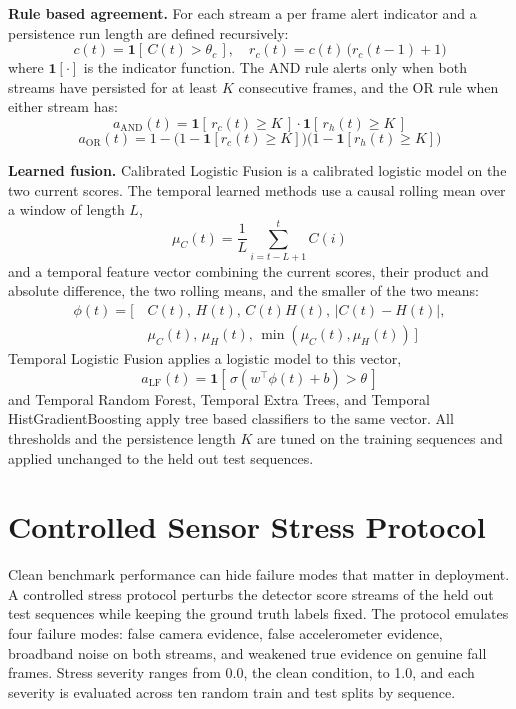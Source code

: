\documentclass[conference]{IEEEtran}
\begin{document}
\textbf{Rule based agreement.} For each stream a per frame alert indicator and a
persistence run length are defined recursively:
\begin{equation}
c(t) = \mathbf{1}[\,C(t) > \theta_c\,], \quad
r_c(t) = c(t)\,\bigl(r_c(t-1) + 1\bigr)
\end{equation}
where $\mathbf{1}[\cdot]$ is the indicator function. The AND rule alerts only
when both streams have persisted for at least $K$ consecutive frames, and the OR
rule when either stream has:
\begin{equation}
a_{\mathrm{AND}}(t) = \mathbf{1}[\,r_c(t) \ge K\,]\cdot\mathbf{1}[\,r_h(t) \ge K\,]
\end{equation}
\begin{equation}
a_{\mathrm{OR}}(t) = 1 - \bigl(1 - \mathbf{1}[r_c(t)\ge K]\bigr)
\bigl(1 - \mathbf{1}[r_h(t)\ge K]\bigr)
\end{equation}

\textbf{Learned fusion.} Calibrated Logistic Fusion is a calibrated logistic
model on the two current scores. The temporal learned methods use a causal
rolling mean over a window of length $L$,
\begin{equation}
\mu_C(t) = \frac{1}{L}\sum_{i=t-L+1}^{t} C(i)
\end{equation}
and a temporal feature vector combining the current scores, their product and
absolute difference, the two rolling means, and the smaller of the two means:
\begin{equation}
\begin{split}
\phi(t) = \bigl[\,&C(t),\, H(t),\, C(t)H(t),\, |C(t)-H(t)|,\\
&\mu_C(t),\, \mu_H(t),\, \min(\mu_C(t),\mu_H(t))\,\bigr]
\end{split}
\end{equation}
Temporal Logistic Fusion applies a logistic model to this vector,
\begin{equation}
a_{\mathrm{LF}}(t) = \mathbf{1}\!\left[\,\sigma(w^{\top}\phi(t) + b) > \theta\,\right]
\end{equation}
and Temporal Random Forest, Temporal Extra Trees, and Temporal
HistGradientBoosting apply tree based classifiers \cite{breiman2001} to the same
vector. All thresholds and the persistence length $K$ are tuned on the training
sequences and applied unchanged to the held out test sequences.

\section{Controlled Sensor Stress Protocol}
Clean benchmark performance can hide failure modes that matter in deployment. A
controlled stress protocol perturbs the detector score streams of the held out
test sequences while keeping the ground truth labels fixed. The protocol
emulates four failure modes: false camera evidence, false accelerometer
evidence, broadband noise on both streams, and weakened true evidence on genuine
fall frames. Stress severity ranges from 0.0, the clean condition, to 1.0, and
each severity is evaluated across ten random train and test splits by sequence.
\end{document}
